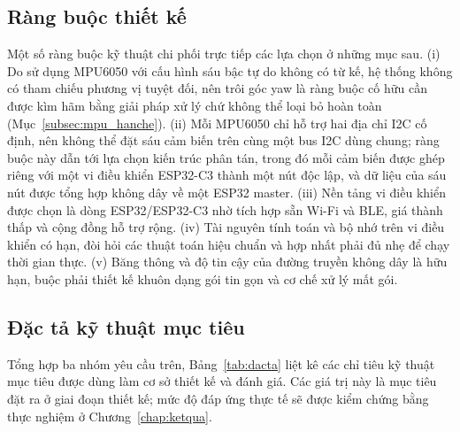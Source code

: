 \documentclass[../DoAn.tex]{subfiles}
\begin{document}
\subsection{Ràng buộc thiết kế}
\label{subsec:yc_rangbuoc}
Một số ràng buộc kỹ thuật chi phối trực tiếp các lựa chọn ở những mục sau. (i) Do
sử dụng MPU6050 với cấu hình sáu bậc tự do không có từ kế, hệ thống không có tham
chiếu phương vị tuyệt đối, nên trôi góc yaw là ràng buộc cố hữu cần được kìm hãm
bằng giải pháp xử lý chứ không thể loại bỏ hoàn toàn
(Mục~\ref{subsec:mpu_hanche}). (ii) Mỗi MPU6050 chỉ hỗ trợ hai địa chỉ I2C cố
định, nên không thể đặt sáu cảm biến trên cùng một bus I2C dùng chung; ràng buộc
này dẫn tới lựa chọn kiến trúc phân tán, trong đó mỗi cảm biến được ghép riêng với
một vi điều khiển ESP32-C3 thành một nút độc lập, và dữ liệu của sáu nút được tổng
hợp không dây về một ESP32 master.
(iii) Nền tảng vi điều khiển được chọn là dòng ESP32/ESP32-C3 nhờ tích hợp sẵn
Wi-Fi và BLE, giá thành thấp và cộng đồng hỗ trợ rộng. (iv) Tài nguyên tính toán
và bộ nhớ trên vi điều khiển có hạn, đòi hỏi các thuật toán hiệu chuẩn và hợp
nhất phải đủ nhẹ để chạy thời gian thực. (v) Băng thông và độ tin cậy của đường
truyền không dây là hữu hạn, buộc phải thiết kế khuôn dạng gói tin gọn và cơ chế
xử lý mất gói.

\subsection{Đặc tả kỹ thuật mục tiêu}
\label{subsec:yc_dacta}
Tổng hợp ba nhóm yêu cầu trên, Bảng~\ref{tab:dacta} liệt kê các chỉ tiêu kỹ thuật
mục tiêu được dùng làm cơ sở thiết kế và đánh giá. Các giá trị này là mục tiêu đặt
ra ở giai đoạn thiết kế; mức độ đáp ứng thực tế sẽ được kiểm chứng bằng thực
nghiệm ở Chương~\ref{chap:ketqua}.
\end{document}
